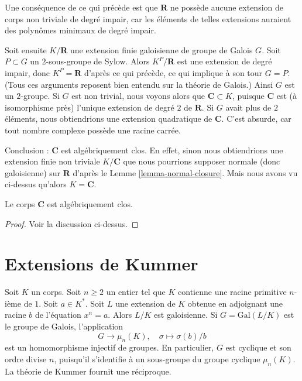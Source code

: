 \medskip\noindent
Une conséquence de ce qui précède est que $\mathbf{R}$ ne possède
aucune extension de corps non triviale de degré impair, car les éléments de telles extensions
auraient des polynômes minimaux de degré impair.

\medskip\noindent
Soit ensuite $K/\mathbf{R}$ une extension finie galoisienne de groupe de Galois $G$.
Soit $P \subset G$ un $2$-sous-groupe de Sylow. Alors $K^P/\mathbf{R}$ est une
extension de degré impair, donc $K^P = \mathbf{R}$ d'après ce qui précède,
ce qui implique à son tour
$G = P$. (Tous ces arguments reposent bien entendu sur la théorie de Galois.)
Ainsi $G$ est un $2$-groupe. Si $G$ est non trivial, nous voyons alors que
$\mathbf{C} \subset K$, puisque $\mathbf{C}$ est (à isomorphisme près) l'unique
extension de degré $2$ de $\mathbf{R}$. Si $G$ avait plus de $2$ éléments,
nous obtiendrions une extension quadratique de $\mathbf{C}$.
C'est absurde, car tout nombre complexe possède une racine carrée.

\medskip\noindent
Conclusion : $\mathbf{C}$ est algébriquement clos. En effet, sinon
nous obtiendrions une extension finie non triviale $K/\mathbf{C}$
que nous pourrions supposer normale (donc galoisienne) sur $\mathbf{R}$ d'après le
Lemme \ref{lemma-normal-closure}. Mais nous avons vu ci-dessus qu'alors
$K = \mathbf{C}$.

\begin{lemma}
\label{lemma-C-algebraically-closed}
Le corps $\mathbf{C}$ est algébriquement clos.
\end{lemma}

\begin{proof}
Voir la discussion ci-dessus.
\end{proof}





\section{Extensions de Kummer}
\label{section-Kummer}

\noindent
Soit $K$ un corps. Soit $n \geq 2$ un entier tel que $K$ contienne
une racine primitive $n$-ième de $1$. Soit $a \in K^*$. Soit $L$ une extension
de $K$ obtenue en adjoignant une racine $b$ de l'équation $x^n = a$.
Alors $L/K$ est galoisienne. Si $G = \text{Gal}(L/K)$ est le groupe de Galois,
l'application
$$
G \longrightarrow \mu_n(K),\quad \sigma \longmapsto \sigma(b)/b
$$
est un homomorphisme injectif de groupes. En particulier, $G$ est cyclique
et son ordre divise $n$, puisqu'il s'identifie à un sous-groupe du groupe cyclique $\mu_n(K)$.
La théorie de Kummer fournit une réciproque.

